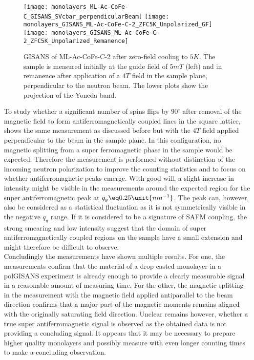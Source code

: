 \documentclass[\main/dresen_thesis.tex]{subfiles}
\begin{document}
  \begin{figure}[tb]
    \centering
    \texttt{[image: monolayers\_ML-Ac-CoFe-C\_GISANS\_SVcbar\_perpendicularBeam]}
    \texttt{[image: monolayers\_GISANS\_ML-Ac-CoFe-C-2\_ZFC5K\_Unpolarized\_GF]}
    \texttt{[image: monolayers\_GISANS\_ML-Ac-CoFe-C-2\_ZFC5K\_Unpolarized\_Remanence]}
    \caption{\label{fig:monolayer:magneticStructure:Gisans5KZFCperpendicular}GISANS of ML-Ac-CoFe-C-2 after zero-field cooling to $5 \unit{K}$. The sample is measured initially at the guide field of $5 \unit{mT}$ (left) and in remanence after application of a $4 \unit{T}$ field in the sample plane, perpendicular to the neutron beam. The lower plots show the projection of the Yoneda band.}
  \end{figure}

  To study whether a significant number of spins flips by $90 ^\circ$ after removal of the magnetic field to form antiferromagnetically coupled lines in the square lattice,  shows the same measurement as discussed before but with the $4 \unit{T}$ field applied perpendicular to the beam in the sample plane.
  In this configuration, no magnetic splitting from a super ferromagnetic phase in the sample would be expected.
  Therefore the measurement is performed without distinction of the incoming neutron polarization to improve the counting statistics and to focus on whether antiferromagnetic peaks emerge.
  With good will, a slight increase in intensity might be visible in the measurements around the expected region for the super antiferromagnetic peak at $q_y \eq 0.25 \unit{nm^{-1}}$.
  The peak can, however, also be considered as a statistical fluctuation as it is not symmetrically visible in the negative $q_y$ range.
  If it is considered to be a signature of SAFM coupling, the strong smearing and low intensity suggest that the domain of super antiferromagnetically coupled regions on the sample have a small extension and might therefore be difficult to observe.
  \\

  Concludingly the measurements have shown multiple results.
  For one, the measurements confirm that the material of a drop-casted monolayer in a polGISANS experiment is already enough to provide a clearly measurable signal in a reasonable amount of measuring time.
  For the other, the magnetic splitting in the measurement with the magnetic field applied antiparallel to the beam direction confirms that a major part of the magnetic moments remains aligned with the originally saturating field direction.
  Unclear remains however, whether a true super antiferromagnetic signal is observed as the obtained data is not providing a concluding signal.
  It appears that it may be necessary to prepare higher quality monolayers and possibly measure with even longer counting times to make a concluding observation.

\end{document}
